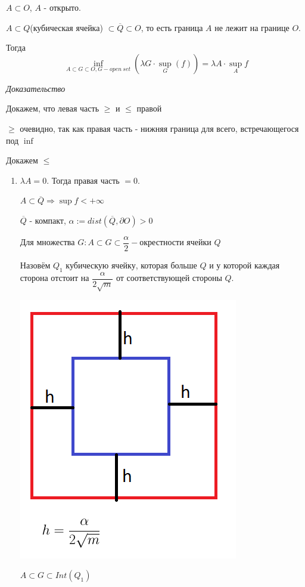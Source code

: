 \documentclass[paper=a4, fontsize=17pt]{article}
\begin{document}
$A \subset O$, $A$ - открыто.

$A \subset Q$(кубическая ячейка) $\subset \overline Q \subset O$, то есть граница $A$ не лежит на границе $O$.

Тогда $$\inf_{A \subset G \subset O, G - open ~ set} (\lambda G \cdot \sup_G(f)) = \lambda A \cdot \sup_A f$$

\emph{Доказательство}

Докажем, что левая часть $\geqslant$ и $\leqslant$ правой

$\geqslant$ очевидно, так как правая часть - нижняя граница для всего, встречающегося под $\inf$

Докажем $\leqslant$

\begin{enumerate}
	\item $\lambda A = 0$. Тогда правая часть $ = 0$. 
	
	$A \subset \overline{Q} \Rightarrow \sup f < + \infty$
	
	$\overline{Q}$ - компакт, $\alpha := dist(\overline{Q}, \partial O) > 0$
	
	Для множества $G: A \subset G \subset \dfrac{\alpha}{2}-$окрестности ячейки $Q$
	
	Назовём $Q_1$ кубическую ячейку, которая больше $Q$ и у которой каждая сторона отстоит на $\dfrac{\alpha}{2 \sqrt{m}}$ от соответствующей стороны $Q$.
	
	\includegraphics[scale=1]{Th21Pic1.png}
	
	$A \subset G \subset Int(Q_1)$
	

\end{enumerate}
\end{document}
